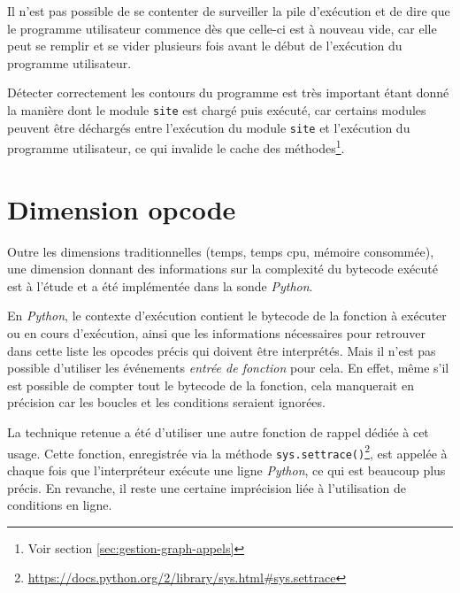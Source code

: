 \begin{note}
Il n'est pas possible de se contenter de surveiller la pile d'exécution et de dire que le programme utilisateur commence dès que celle-ci est à nouveau vide, car elle peut se remplir et se vider plusieurs fois avant le début de l'exécution du programme utilisateur.
\end{note}

\begin{note}
Détecter correctement les contours du programme est très important étant donné la manière dont le module \verb|site| est chargé puis exécuté, car certains modules peuvent être déchargés entre l'exécution du module \verb|site| et l'exécution du programme utilisateur, ce qui invalide le cache des méthodes\footnote{Voir section \vref{sec:gestion-graph-appels}}.
\end{note}

  \section{Dimension opcode}
    
Outre les dimensions traditionnelles (temps, temps cpu, mémoire consommée), une dimension donnant des informations sur la complexité du \gls{bytecode} exécuté est à l'étude et a été implémentée dans la sonde \emph{Python}.

En \emph{Python}, le contexte d'exécution contient le \gls{bytecode} de la fonction à exécuter ou en cours d'exécution, ainsi que les informations nécessaires pour retrouver dans cette liste les \glspl{opcode} précis qui doivent être interprétés. Mais il n'est pas possible d'utiliser les événements \emph{entrée de fonction} pour cela. En effet, même s'il est possible de compter tout le \gls{bytecode} de la fonction, cela manquerait en précision car les boucles et les conditions seraient ignorées.

La technique retenue a été d'utiliser une autre fonction de rappel dédiée à cet usage. Cette fonction, enregistrée via la méthode \verb|sys.settrace()|\footnote{\url{https://docs.python.org/2/library/sys.html#sys.settrace}}, est appelée à chaque fois que l'interpréteur exécute une ligne \emph{Python}, ce qui est beaucoup plus précis. En revanche, il reste une certaine imprécision liée à l'utilisation de conditions en ligne.

